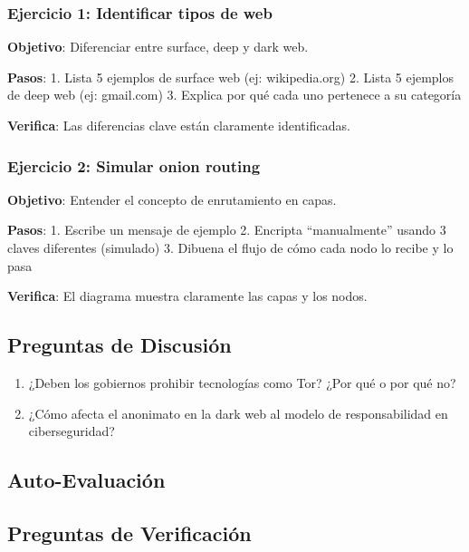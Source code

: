 \documentclass[
  letterpaper,
]{report}
\providecommand{\tightlist}{%
  \setlength{\itemsep}{0pt}\setlength{\parskip}{0pt}}
\begin{document}
\subsubsection{Ejercicio 1: Identificar tipos de
web}\label{ejercicio-1-identificar-tipos-de-web}

\textbf{Objetivo}: Diferenciar entre surface, deep y dark web.

\textbf{Pasos}: 1. Lista 5 ejemplos de surface web (ej: wikipedia.org)
2. Lista 5 ejemplos de deep web (ej: gmail.com) 3. Explica por qué cada
uno pertenece a su categoría

\textbf{Verifica}: Las diferencias clave están claramente identificadas.

\subsubsection{Ejercicio 2: Simular onion
routing}\label{ejercicio-2-simular-onion-routing}

\textbf{Objetivo}: Entender el concepto de enrutamiento en capas.

\textbf{Pasos}: 1. Escribe un mensaje de ejemplo 2. Encripta
``manualmente'' usando 3 claves diferentes (simulado) 3. Dibuena el
flujo de cómo cada nodo lo recibe y lo pasa

\textbf{Verifica}: El diagrama muestra claramente las capas y los nodos.

\subsection{Preguntas de Discusión}\label{preguntas-de-discusiuxf3n}

\begin{enumerate}
\def\labelenumi{\arabic{enumi}.}
\tightlist
\item
  ¿Deben los gobiernos prohibir tecnologías como Tor? ¿Por qué o por qué
  no?
\item
  ¿Cómo afecta el anonimato en la dark web al modelo de responsabilidad
  en ciberseguridad?
\end{enumerate}

\subsection{Auto-Evaluación}\label{auto-evaluaciuxf3n}

\subsection{Preguntas de
Verificación}\label{preguntas-de-verificaciuxf3n}
\end{document}
